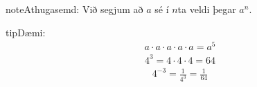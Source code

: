 \documentclass[a4paper,10pt,icelandic]{sphinxmanual}
\begin{document}
\begin{sphinxadmonition}{note}{Athugasemd:}
Við segjum að \(a\) sé í \(n\)\sphinxhyphen{}ta veldi þegar \(a^n\).
\end{sphinxadmonition}

\begin{sphinxadmonition}{tip}{Dæmi:}
\begin{equation*}
\begin{split}a \cdot a \cdot a \cdot a \cdot a=a^5\end{split}
\end{equation*}
\begin{equation*}
\begin{split}4^3=4 \cdot 4 \cdot 4=64\end{split}
\end{equation*}
\begin{equation*}
\begin{split}4^{-3}=\frac{1}{4^3}=\frac{1}{64}\end{split}
\end{equation*}\end{sphinxadmonition}
\end{document}
